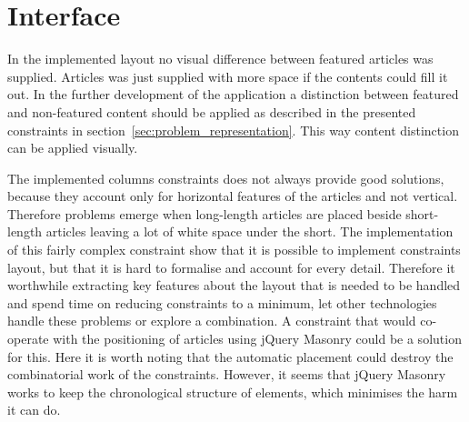 \section{Interface}
In the implemented layout no visual difference between featured articles was supplied. Articles was just supplied with more space if the contents could fill it out. In the further development of the application a distinction between featured and non-featured content should be applied as described in the presented constraints in section~\vref{sec:problem_representation}. This way content distinction can be applied visually.

The implemented columns constraints does not always provide good solutions, because they account only for horizontal features of the articles and not vertical. Therefore problems emerge when long-length articles are placed beside short-length articles leaving a lot of white space under the short. The implementation of this fairly complex constraint show that it is possible to implement constraints layout, but that it is hard to formalise and account for every detail. Therefore it worthwhile extracting key features about the layout that is needed to be handled and spend time on reducing constraints to a minimum, let other technologies handle these problems or explore a combination. A constraint that would co-operate with the positioning of articles using jQuery Masonry could be a solution for this. Here it is worth noting that the automatic placement could destroy the combinatorial work of the constraints. However, it seems that jQuery Masonry works to keep the chronological structure of elements, which minimises the harm it can do.

